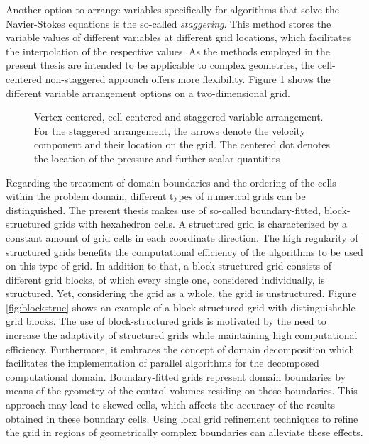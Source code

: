 Another option to arrange variables specifically for algorithms that solve the Navier-Stokes equations is the so-called \emph{staggering}. This method stores the variable values of different variables at different grid locations, which facilitates the interpolation of the respective values. As the methods employed in the present thesis are intended to be applicable to complex geometries, the cell-centered non-staggered approach offers more flexibility. Figure \ref{fig:cell vertex} shows the different variable arrangement options on a two-dimensional grid.

\begin{figure}[h!]
    \hfil
    \hfil
    \caption{Vertex centered, cell-centered and staggered variable arrangement. For the staggered arrangement, the arrows denote the velocity component and their location on the grid. The centered dot denotes the location of the pressure and further scalar quantities}
   \label{fig:cell vertex}
\end{figure}

Regarding the treatment of domain boundaries and the ordering of the cells within the problem domain, different types of numerical grids can be distinguished. The present thesis makes use of so-called boundary-fitted, block-structured grids with hexahedron cells. A structured grid is characterized by a constant amount of grid cells in each coordinate direction. The high regularity of structured grids benefits the computational efficiency of the algorithms to be used on this type of grid. In addition to that, a block-structured grid consists of different grid blocks, of which every single one, considered individually, is structured. Yet, considering the grid as a whole, the grid is unstructured. Figure \ref{fig:blockstruc} shows an example of a block-structured grid with distinguishable grid blocks. The use of block-structured grids is motivated by the need to increase the adaptivity of structured grids while maintaining high computational efficiency. Furthermore, it embraces the concept of domain decomposition which facilitates the implementation of parallel algorithms for the decomposed computational domain. Boundary-fitted grids represent domain boundaries by means of the geometry of the control volumes residing on those boundaries. This approach may lead to skewed cells, which affects the accuracy of the results obtained in these boundary cells. Using local grid refinement techniques to refine the grid in regions of geometrically complex boundaries can alleviate these effects.

